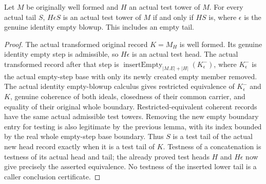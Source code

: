 \begin{theorem}
\label{hir:original-interior-empty-test-history}
\leanok
{}
Let $M$ be originally well formed and $H$ an actual test tower of $M$.
For every actual tail $S$, $H\epsilon S$ is an actual test tower of $M$
if and only if $HS$ is, where $\epsilon$ is the genuine identity empty
blowup.  This includes an empty tail.
\end{theorem}
\begin{proof}
The actual transformed original record $K=M_H$ is well formed.  Its
genuine identity empty step is admissible, so $H\epsilon$ is an actual
test head.  The actual transformed record after that step is
$\operatorname{insertEmpty}_{|M.E|+|H|}(K_\epsilon^-)$, where
$K_\epsilon^-$ is the actual empty-step base with only its newly created
empty member removed.  The actual identity empty-blowup calculus gives
restricted equivalence of $K_\epsilon^-$ and $K$, genuine coherence of
both ideals, closedness of their common carrier, and equality of their
original whole boundary.  Restricted-equivalent coherent records have
the same actual admissible test towers.  Removing the new empty boundary
entry for testing is also legitimate by the previous lemma, with its
index bounded by the real whole empty-step base boundary.  Thus $S$ is
a test tail of the actual new head record exactly when it is a test tail
of $K$.  Testness of a concatenation is testness of its actual head and
tail; the already proved test heads $H$ and $H\epsilon$ now give precisely
the asserted equivalence.  No testness of the inserted lower tail is a
caller conclusion certificate.
\end{proof}

